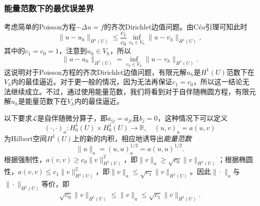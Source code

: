 \documentclass[a4paper,10pt]{ctexart}
\begin{document}
\subsubsection{能量范数下的最优误差界}
考虑简单的Poisson方程$ -\Delta u = f $的齐次Dirichlet边值问题。由Céa引理可知此时
\[
    \| u-u_h \|_{H^1(U)} \leqslant \frac{c_1}{c_0} \inf_{v_h\in V_h}\| u-v_h \|_{H^1(U)},
\]
其中的$ c_1=c_0=1 $，注意到$ u_h\in V_h $，所以
\begin{equation}
    \| u-u_h \|_{H^1(U)} = \inf_{v_h\in V_h}\| u-v_h \|_{H^1(U)}.
\end{equation}
这说明对于Poisson方程的齐次Dirichlet边值问题，有限元解$ u_h $是$ H^1(U) $范数下在$ V_h $内的最佳逼近。对于更一般的情况，因为无法再保证$ c_1 = c_0 $，所以这一结论无法继续成立。不过，通过使用能量范数，我们将看到对于自伴随椭圆方程，有限元解$ u_h $是能量范数下在$ V_h $内的最佳逼近。

以下要求$ \mathcal{L} $是自伴随微分算子，即$ a_{ij} = a_{ji} $且$ b_j=0 $，这种情况下可以定义
\begin{equation}
    (\cdot,\cdot)_a : H^1_0(U)\times H^1_0(U)\to \mathbb{R},\quad (u,v)_a = a(u,v)
\end{equation}
为Hilbert空间$ H^1(U) $上的新的内积，相应地诱导出\emph{能量范数}
\begin{equation}
    \| u \|_a = (u,u)_a^{1 / 2} = a(u,u)^{1 / 2}.
\end{equation}
根据强制性，$ a(v,v)\geqslant c_0 \| v \|^2_{H^1(U)} $，即$ \| v \|_a\geqslant \sqrt{c_0} \| v \|_{H^1(U)} $；根据椭圆性，$ a(v,v)\leqslant c_1 \| v \|_{H^1(U)}^2 $，即$ \| v \|_a\leqslant \sqrt{c_1} \| v \|_{H^1(U)} $。因此$ \| \cdot \|_a $与$ \| \cdot \|_{H^1(U)} $等价，即
\begin{equation}
    \sqrt{c_0} \| v \|_{H^1(U)} \leqslant \| v \|_a \leqslant \sqrt{c_1} \| v \|_{H^1(U)}.
\end{equation}
\end{document}
